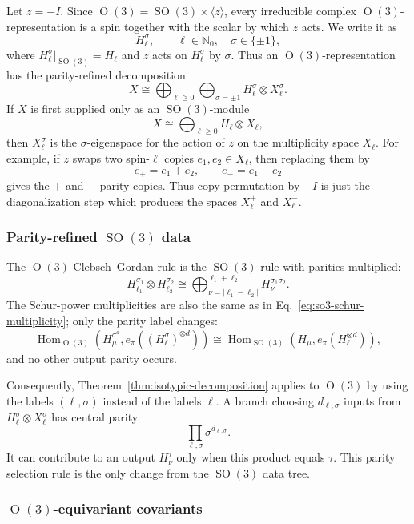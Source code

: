 \documentclass[11pt]{article}
\newcommand{\dsN}{\mathbb{N}}
\newcommand{\SO}{\operatorname{SO}}
\newcommand{\Orth}{\operatorname{O}}
\theoremstyle{definition}
\begin{document}
Let $z=-I$.
Since $\Orth(3)=\SO(3)\times \langle z\rangle$, every irreducible complex $\Orth(3)$-representation is a spin together with the scalar by which $z$ acts.
We write it as
\[
  H_\ell^\sigma,
  \qquad
  \ell\in\dsN_0,\quad \sigma\in\{\pm1\},
\]
where $H_\ell^\sigma|_{\SO(3)}=H_\ell$ and $z$ acts on $H_\ell^\sigma$ by $\sigma$.
Thus an $\Orth(3)$-representation has the parity-refined decomposition
\[
  X\cong
  \bigoplus_{\ell\ge 0}\bigoplus_{\sigma=\pm1}
  H_\ell^\sigma\otimes X_\ell^\sigma .
\]
If $X$ is first supplied only as an $\SO(3)$-module
\[
  X\cong \bigoplus_{\ell\ge 0} H_\ell\otimes X_\ell,
\]
then $X_\ell^\sigma$ is the $\sigma$-eigenspace for the action of $z$ on the multiplicity space $X_\ell$.
For example, if $z$ swaps two spin-$\ell$ copies $e_1,e_2\in X_\ell$, then replacing them by
\[
  e_+ = e_1+e_2,
  \qquad
  e_- = e_1-e_2
\]
gives the $+$ and $-$ parity copies.
Thus copy permutation by $-I$ is just the diagonalization step which produces the spaces $X_\ell^+$ and $X_\ell^-$.

\subsubsection{Parity-refined \texorpdfstring{$\SO(3)$}{SO(3)} data}

The $\Orth(3)$ Clebsch--Gordan rule is the $\SO(3)$ rule with parities multiplied:
\[
  H_{\ell_1}^{\sigma_1}\otimes H_{\ell_2}^{\sigma_2}
  \cong
  \bigoplus_{\nu=|\ell_1-\ell_2|}^{\ell_1+\ell_2}
  H_\nu^{\sigma_1\sigma_2}.
\]
The Schur-power multiplicities are also the same as in Eq.~\eqref{eq:so3-schur-multiplicity}; only the parity label changes:
\[
  \operatorname{Hom}_{\Orth(3)}\!\left(
    H_\mu^{\sigma^d},
    e_\pi\!\left((H_\ell^\sigma)^{\otimes d}\right)
  \right)
  \cong
  \operatorname{Hom}_{\SO(3)}\!\left(
    H_\mu,
    e_\pi(H_\ell^{\otimes d})
  \right),
\]
and no other output parity occurs.

Consequently, Theorem~\ref{thm:isotypic-decomposition} applies to $\Orth(3)$ by using the labels $(\ell,\sigma)$ instead of the labels $\ell$.
A branch choosing $d_{\ell,\sigma}$ inputs from $H_\ell^\sigma\otimes X_\ell^\sigma$ has central parity
\[
  \prod_{\ell,\sigma}\sigma^{d_{\ell,\sigma}}.
\]
It can contribute to an output $H_\nu^\tau$ only when this product equals $\tau$.
This parity selection rule is the only change from the $\SO(3)$ data tree.

\subsubsection{\texorpdfstring{$\Orth(3)$-equivariant covariants}{O(3)-equivariant covariants}}
\end{document}
